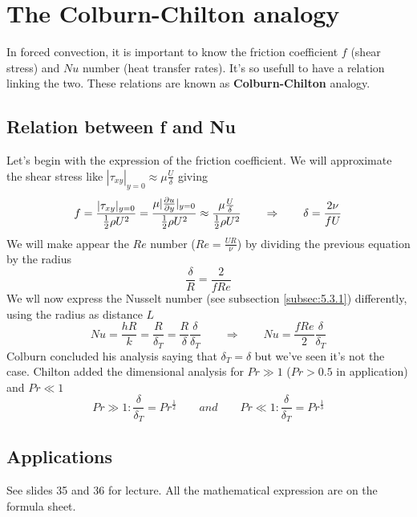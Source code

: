 \section{The Colburn-Chilton analogy}
	In forced convection, it is important to know the friction coefficient $f$ (shear stress) and $Nu$ number (heat transfer rates). It's so usefull to have a relation linking the two. These relations are known as \textbf{Colburn-Chilton} analogy. 
	
	\subsection{Relation between f and Nu}
	Let's begin with the expression of the friction coefficient. We will approximate the shear stress like $|\tau _{xy}|_{y=0} \approx \mu\frac{U}{\delta}$ giving
	\begin{equation}
		f = \frac{|\tau _{xy}|_{y=0}}{\frac{1}{2}\rho U^2} = \frac{\mu |\frac{\D u}{\D y}|_{y=0}}{\frac{1}{2}\rho U^2} \approx \frac{\mu \frac{U}{\delta}}{\frac{1}{2}\rho U^2} \qquad \Rightarrow \qquad \delta = \frac{2\nu}{fU}
	\end{equation}
	We will make appear the $Re$ number ($Re = \frac{UR}{\nu}$) by dividing the previous equation by the radius
	\begin{equation}
		\frac{\delta}{R} = \frac{2}{fRe}
	\end{equation}
	We wll now express the Nusselt number (see subsection \ref{subsec:5.3.1}) differently, using the radius as distance $L$
	\begin{equation}
		Nu = \frac{hR}{k} = \frac{R}{\delta _T} = \frac{R}{\delta}\frac{\delta}{\delta _T} \qquad \Rightarrow \qquad Nu = \frac{fRe}{2}\frac{\delta}{\delta _T}
	\end{equation}
	Colburn concluded his analysis saying that $\delta _T = \delta$ but we've seen it's not the case. Chilton added the dimensional analysis for $Pr \gg 1$ ($Pr > 0.5$ in application) and $Pr \ll 1$
	\begin{equation}
		Pr \gg 1 : \frac{\delta }{\delta _T} = Pr ^{\frac{1}{2}} \qquad and \qquad Pr \ll 1 : \frac{\delta}{\delta _T} = Pr ^{\frac{1}{3}}
	\end{equation}

\subsection{Applications}
	See slides 35 and 36 for lecture. All the mathematical expression are on the formula sheet. 
	
